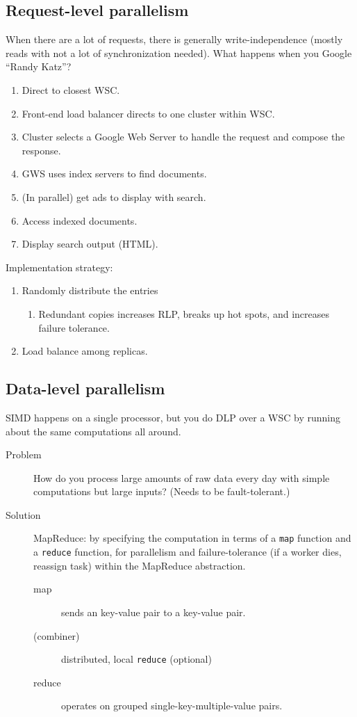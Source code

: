 \subsection{Request-level parallelism}
When there are a lot of requests, there is generally write-independence (mostly reads with not a lot of synchronization needed).
What happens when you Google ``Randy Katz''?
\begin{enumerate}
	\item Direct to closest WSC.
	\item Front-end load balancer directs to one cluster within WSC.
	\item Cluster selects a Google Web Server to handle the request and compose the response.
	\item GWS uses index servers to find documents.
	\item (In parallel) get ads to display with search.
	\item Access indexed documents.
	\item Display search output (HTML).
\end{enumerate}
Implementation strategy:
\begin{enumerate}
	\item Randomly distribute the entries
	\begin{enumerate}
		\item Redundant copies increases RLP, breaks up hot spots, and increases failure tolerance.
	\end{enumerate}
	\item Load balance among replicas.
\end{enumerate}

\subsection{Data-level parallelism}
SIMD happens on a single processor, but you do DLP over a WSC by running about the same computations all around.

\begin{description}
\item[Problem] How do you process large amounts of raw data every day with simple computations but large inputs? (Needs to be fault-tolerant.)
\item[Solution] MapReduce: by specifying the computation in terms of a \texttt{map} function and a \texttt{reduce} function, for parallelism and failure-tolerance (if a worker dies, reassign task) within the MapReduce abstraction.
\begin{description}
	\item[map] sends an key-value pair to a key-value pair.
	\item[(combiner)] distributed, local \texttt{reduce} (optional)
	\item[reduce] operates on grouped single-key-multiple-value pairs.
\end{description}
\end{description}